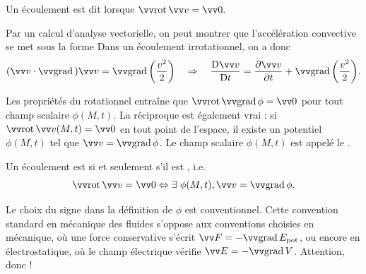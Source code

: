 \documentclass[12pt,fancy]{cours}
\begin{document}
 \begin{definition}\label{def:irro}
 Un écoulement est dit  lorsque
$
 \Rot{\Vec{v}} = \Vec{0}.
 $
 \end{definition}

\begin{remarque}
  Par un calcul d'analyse vectorielle, on peut montrer que l'accélération convective se met sous la forme
Dans un écoulement irrotationnel, on a donc 
\begin{equation}
  (\Vec{v} \cdot \grad) \Vec{v} =  \Grad{\left(\frac{v^2}{2}\right)} \Rar \Dt{\Vec{v}} = \dr{\Vec{v}}{t} + \Grad{\left(\frac{v^2}{2}\right)}.
\end{equation}
\end{remarque}



Les propriétés du rotationnel entraîne que $\Rot{\Grad{\phi}}=\Vec{0}$ pour tout champ scalaire $\phi(M,t)$.
La réciproque est également vrai : si $\Rot{\Vec{v}}(M,t) = \Vec{0}$ en tout point de l'espace, il existe un potentiel $\phi(M,t)$ tel que $\Vec{v} = \Grad{\phi}$.
\noindent Le champ scalaire $\phi(M,t)$ est appelé le .

\begin{prop}\label{prop:}
  Un écoulement est  si et seulement s'il est , i.e. 
  \begin{equation*}
    \Rot{\Vec{v}} = \Vec{0} \Leftrightarrow \exists~\phi(M,t), \Vec{v} = \Grad{\phi}.
  \end{equation*}
\end{prop}
\begin{remarque}
  Le choix du signe dans la définition de $\phi$ est conventionnel. Cette convention standard en mécanique des fluides  s'oppose aux conventions choisies en mécanique, où une force conservative s'écrit $\Vec{F}=-\Grad{E_{\rm{pot}}}$, ou encore en électrostatique, où le champ électrique vérifie $\Vec{E}=-\Grad{V}$. Attention, donc !
\end{remarque}
\end{document}
